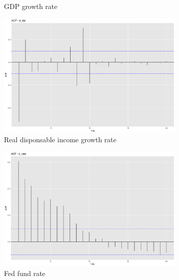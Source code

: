 \documentclass[hidelinks,12pts]{article}
\DeclareMathOperator{\1}{\mathbbm{1}}
\begin{document}
\begin{figure}[h!]
\begin{subfigure}[b]{0.45\textwidth}
        \caption*{GDP growth rate}
    \end{subfigure}
    \hfill
    \begin{subfigure}[b]{0.45\textwidth}
        \centering
        \includegraphics[width=\textwidth]{IMAGES/acf_dpi.png}
        \caption*{Real disponsable income growth rate }
    \end{subfigure}
    \hfill 
    \centering
    \begin{subfigure}[b]{0.45\textwidth}
        \centering
        \includegraphics[width=\textwidth]{IMAGES/acf_rate.png}
        \caption*{Fed fund rate}
    \end{subfigure}
    \hfill
    \begin{subfigure}[b]{0.45\textwidth}
        \centering

\end{subfigure}
\end{figure}
\end{document}
